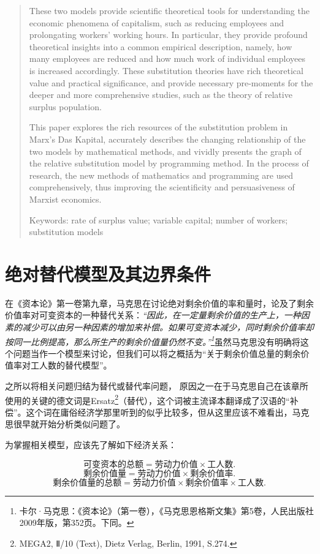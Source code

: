 \documentclass[a4paper,11pt]{ctexart}
\begin{document}
\begin{abstract}
These two models provide scientific theoretical tools for understanding the economic phenomena of capitalism, such as reducing employees and prolongating workers' working hours. In particular, they provide profound theoretical insights into a common empirical description, namely, how many employees are reduced and how much work of individual employees is increased accordingly. These substitution theories have rich theoretical value and practical significance, and provide necessary pre-moments for the deeper and more comprehensive studies, such as the theory of relative surplus population.

This paper explores the rich resources of the substitution problem in Marx's Das Kapital, accurately describes the changing relationship of the two models by mathematical methods, and vividly presents the graph of the relative substitution model by programming method. In the process of research, the new methods of mathematics and programming are used comprehensively, thus improving the scientificity and persuasiveness of Marxist economics.

Keywords: rate of surplus value; variable capital; number of workers; substitution models

\end{abstract}

\section{绝对替代模型及其边界条件}

在《资本论》第一卷第九章，马克思在讨论绝对剩余价值的率和量时，论及了剩余价值率对可变资本的一种替代关系：\textit{“因此，在一定量剩余价值的生产上，一种因素的减少可以由另一种因素的增加来补偿。如果可变资本减少，同时剩余价值率却按同一比例提高，那么所生产的剩余价值量仍然不变。”\footnote{卡尔·马克思：《资本论》（第一卷），《马克思恩格斯文集》第5卷，人民出版社2009年版，第352页。下同。}}虽然马克思没有明确将这个问题当作一个模型来讨论，但我们可以将之概括为“关于剩余价值总量的剩余价值率对工人数的替代模型”。

之所以将相关问题归结为替代或替代率问题， 原因之一在于马克思自己在该章所使用的关键的德文词是Ersatz\footnote{MEGA2, Ⅱ/10 (Text), Dietz Verlag, Berlin, 1991, S.274.}（替代），这个词被主流译本翻译成了汉语的“补偿”。这个词在庸俗经济学那里听到的似乎比较多，但从这里应该不难看出，马克思很早就开始分析类似问题了。

为掌握相关模型，应该先了解如下经济关系：

$$\mbox{可变资本的总额} = \mbox{劳动力价值} \times \mbox{工人数}.$$
$$\mbox{剩余价值量} = \mbox{劳动力价值} \times \mbox{剩余价值率}.$$
$$\mbox{剩余价值量的总额} = \mbox{劳动力价值} \times \mbox{剩余价值率} \times \mbox{工人数}.$$
\end{document}
